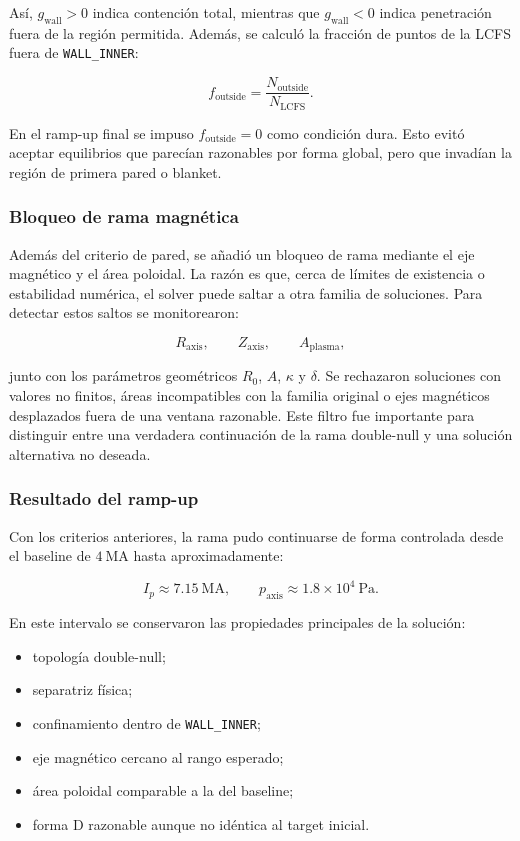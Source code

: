 \documentclass[11pt,a4paper]{article}
\begin{document}
Así, $g_{\mathrm{wall}}>0$ indica contención total, mientras que $g_{\mathrm{wall}}<0$ indica
penetración fuera de la región permitida. Además, se calculó la fracción de puntos de la LCFS
fuera de \texttt{WALL\_INNER}:

\[
f_{\mathrm{outside}} =
\frac{N_{\mathrm{outside}}}{N_{\mathrm{LCFS}}}.
\]

En el ramp-up final se impuso $f_{\mathrm{outside}}=0$ como condición dura. Esto evitó aceptar
equilibrios que parecían razonables por forma global, pero que invadían la región de primera
pared o blanket.

\subsubsection{Bloqueo de rama magnética}
Además del criterio de pared, se añadió un bloqueo de rama mediante el eje magnético y el área
poloidal. La razón es que, cerca de límites de existencia o estabilidad numérica, el solver puede
saltar a otra familia de soluciones. Para detectar estos saltos se monitorearon:

\[
R_{\mathrm{axis}},\qquad Z_{\mathrm{axis}},\qquad A_{\mathrm{plasma}},
\]

junto con los parámetros geométricos $R_0$, $A$, $\kappa$ y $\delta$. Se rechazaron soluciones
con valores no finitos, áreas incompatibles con la familia original o ejes magnéticos desplazados
fuera de una ventana razonable. Este filtro fue importante para distinguir entre una verdadera
continuación de la rama double-null y una solución alternativa no deseada.

\subsubsection{Resultado del ramp-up}
Con los criterios anteriores, la rama pudo continuarse de forma controlada desde el baseline de
$4~\mathrm{MA}$ hasta aproximadamente:

\[
I_p \approx 7.15~\mathrm{MA}, \qquad
p_{\mathrm{axis}} \approx 1.8\times10^4~\mathrm{Pa}.
\]

En este intervalo se conservaron las propiedades principales de la solución:

\begin{itemize}
    \item topología double-null;
    \item separatriz física;
    \item confinamiento dentro de \texttt{WALL\_INNER};
    \item eje magnético cercano al rango esperado;
    \item área poloidal comparable a la del baseline;
    \item forma D razonable aunque no idéntica al target inicial.
\end{itemize}
\end{document}
